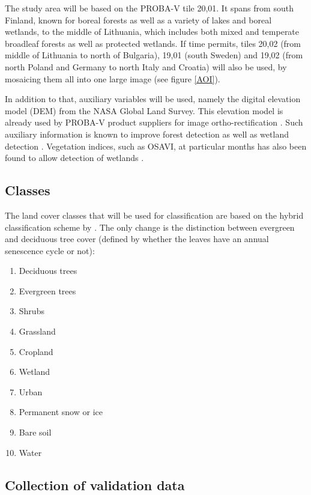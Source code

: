\documentclass[a4paper,10pt]{article}
\begin{document}
The study area will be based on the PROBA-V tile 20,01. It spans from south Finland, known for boreal forests as well as a variety of lakes and boreal wetlands, to the middle of Lithuania, which includes both mixed and temperate broadleaf forests as well as protected wetlands. If time permits, tiles 20,02 (from middle of Lithuania to north of Bulgaria), 19,01 (south Sweden) and 19,02 (from north Poland and Germany to north Italy and Croatia) will also be used, by mosaicing them all into one large image (see figure \ref{AOI}).

In addition to that, auxiliary variables will be used, namely the digital elevation model (DEM) from the NASA Global Land Survey. This elevation model is already used by PROBA-V product suppliers for image ortho-rectification \cite{probavguide}. Such auxiliary information is known to improve forest detection as well as wetland detection \cite{sader1995wetlands}. Vegetation indices, such as OSAVI, at particular months has also been found to allow detection of wetlands \cite{davranche2010wetland}.

\subsection{Classes}

The land cover classes that will be used for classification are based on the hybrid classification scheme by \cite{see2015hybrid}. The only change is the distinction between evergreen and deciduous tree cover (defined by whether the leaves have an annual senescence cycle or not):
\begin{enumerate}
 \item Deciduous trees
 \item Evergreen trees
 \item Shrubs
 \item Grassland
 \item Cropland
 \item Wetland
 \item Urban
 \item Permanent snow or ice
 \item Bare soil
 \item Water
\end{enumerate}

\subsection{Collection of validation data}
\end{document}
